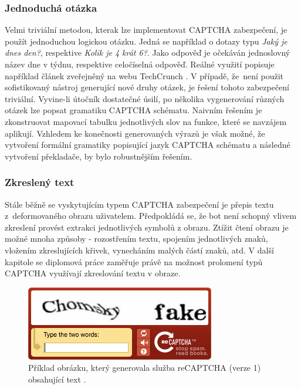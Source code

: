 \documentclass[
  field=ainfp,
  master=true,
  biblatex,
  sourcecodes=false,
  theorems=false,
  glossaries,
  index
]{kidiplom}
\begin{document}
\subsubsection*{Jednoduchá otázka}
Velmi triviální metodou, kterak lze implementovat CAPTCHA zabezpečení, je použít jednoduchou logickou otázku. Jedná se například o dotazy typu \textit{Jaký je dnes den?}, respektive \textit{Kolik je 4 krát 6?}. Jako odpověď je očekáván jednoslovný název dne v týdnu, respektive celočíselná odpověď. Reál\-né využití popisuje například článek zveřejněný na webu TechCrunch \cite{web:textcaptcha}. V případě, že~není použit sofistikovaný nástroj generující nové druhy otázek, je řešení tohoto zabez\-pe\-čení triviální. Vyvine-li útočník dostatečné úsilí, po několika vygenerování různých otázek lze popsat gramatiku CAPTCHA schématu. Naivním řešením je zkonstruovat mapovací tabulku jednotlivých slov na funkce, které se navzájem aplikují. Vzhledem ke konečnosti generovaných výrazů je však možné, že vytvoření formální gramatiky popisující jazyk CAPTCHA schématu a následné vytvoření překladače, by bylo robustnějším řešením. 

\subsubsection*{Zkreslený text}
Stále běžně se vyskytujícím typem CAPTCHA zabezpečení je přepis textu z~deformovaného obrazu uživatelem. Předpokládá se, že bot není schopný vlivem zkreslení provést extrakci jednotlivých symbolů z obrazu. Ztížit čtení obrazu je možné mnoha způsoby - rozostřením textu, spojením jednotlivých znaků, vložením zkreslujících křivek, vynecháním malých částí znaků, atd. V další kapitole se diplomová práce zaměřuje právě na možnost prolomení typů CAPTCHA využívají zkreslování textu v obraze.

\begin{figure}[H]
  \centering
  \includegraphics[scale=0.8]{images/text_image_captcha.jpg}
  \caption{Příklad obrázku, který generovala služba reCAPTCHA (verze 1) obsahující text .}
  \label{fig:captcha_text_image}
\end{figure}
\end{document}
